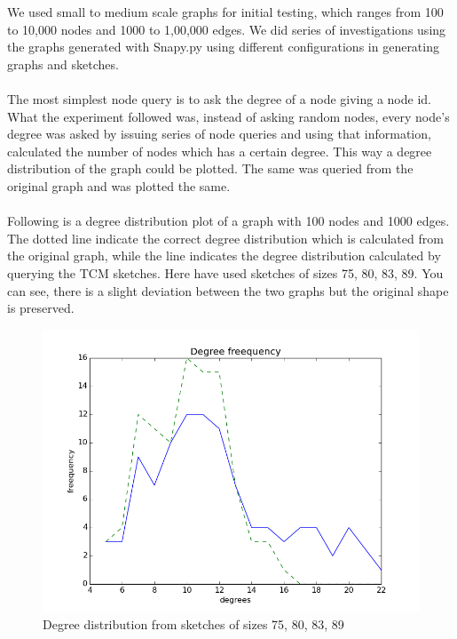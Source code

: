 \documentclass[12pt]{report}
\numberwithin{figure}{section}
\numberwithin{table}{section}
\begin{document}
We used small to medium scale graphs for initial testing, which ranges from 100 to 10,000 nodes and 1000 to 1,00,000 edges.  We did series of investigations using the graphs generated with Snapy.py using different configurations in generating graphs and sketches.

\paragraph{}

The most simplest node query is to ask the degree of a node giving a node id. What the experiment followed was, instead of asking random nodes, every node’s degree was asked by issuing series of node queries and using that information, calculated the number of nodes which has a certain degree. This way a degree distribution of the graph could be plotted. The same was queried from the original graph and was plotted the same.

\paragraph{}

Following is a degree distribution plot of a graph with 100 nodes and 1000 edges. The dotted line indicate the correct degree distribution which is calculated from the original graph, while the line indicates the degree distribution calculated by querying the TCM sketches. Here have used sketches of sizes 75, 80, 83, 89. You can see, there is a slight deviation between the two graphs but the original shape is preserved. 

\begin{figure}[H]
\centering
\includegraphics[scale=0.6]{images/dd1}
\caption{Degree distribution from sketches of sizes 75, 80, 83, 89}
\end{figure}
\end{document}
